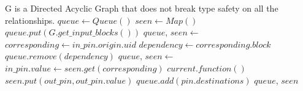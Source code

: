 \documentclass[12pt, varwidth=20cm]{standalone}
\begin{document}
  \begin{algorithmic}[1]
    \Require G is a Directed Acyclic Graph that does not break
    type safety on all the relationships.
      \State $queue \gets Queue()$
      \State $seen \gets Map()$
      \State $queue.put(G.get\_input\_blocks())$ 
        \State $queue$, $seen \gets$ 
      \EndWhile
    \EndFunction
    \\
        \State $corresponding \gets in\_pin.origin.uid$
          \State $dependency \gets corresponding.block$
           
            \State $queue.remove(dependency)$
          \EndIf
          \State $queue$, $seen \gets$ 
        \EndIf
        \State $in\_pin.value \gets seen.get(corresponding)$
      \EndFor
      \State $current.function()$ 
        \State $seen.put(out\_pin, out\_pin.value)$
        \State $queue.add(pin.destinations)$
      \EndFor
      \State \Return $queue$, $seen$
    \EndFunction
  \end{algorithmic}
\end{document}
